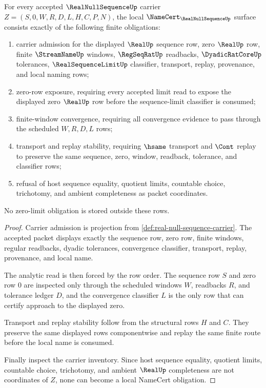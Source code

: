 \begin{theorem}
\label{thm:real-null-sequence-namecert-obligations}
For every accepted $\RealNullSequenceUp$ carrier $Z=(S,0,W,R,D,L,H,C,P,N)$, the local $\NameCert_{\RealNullSequenceUp}$ surface consists exactly of the following finite obligations:
\begin{enumerate}
\item carrier admission for the displayed $\RealUp$ sequence row, zero $\RealUp$ row, finite $\StreamNameUp$ windows, $\RegSeqRatUp$ readbacks, $\DyadicRatCoreUp$ tolerances, $\RealSequenceLimitUp$ classifier, transport, replay, provenance, and local naming rows;
\item zero-row exposure, requiring every accepted limit read to expose the displayed zero $\RealUp$ row before the sequence-limit classifier is consumed;
\item finite-window convergence, requiring all convergence evidence to pass through the scheduled $W,R,D,L$ rows;
\item transport and replay stability, requiring $\hsame$ transport and $\Cont$ replay to preserve the same sequence, zero, window, readback, tolerance, and classifier rows;
\item refusal of host sequence equality, quotient limits, countable choice, trichotomy, and ambient completeness as packet coordinates.
\end{enumerate}
No zero-limit obligation is stored outside these rows.
\end{theorem}
\begin{proof}
Carrier admission is projection from \autoref{def:real-null-sequence-carrier}. The accepted packet displays exactly the sequence row, zero row, finite windows, regular readbacks, dyadic tolerances, convergence classifier, transport, replay, provenance, and local name.

The analytic read is then forced by the row order. The sequence row $S$ and zero row $0$ are inspected only through the scheduled windows $W$, readbacks $R$, and tolerance ledger $D$, and the convergence classifier $L$ is the only row that can certify approach to the displayed zero.

Transport and replay stability follow from the structural rows $H$ and $C$. They preserve the same displayed rows componentwise and replay the same finite route before the local name is consumed.

Finally inspect the carrier inventory. Since host sequence equality, quotient limits, countable choice, trichotomy, and ambient $\RealUp$ completeness are not coordinates of $Z$, none can become a local NameCert obligation.
\end{proof}

